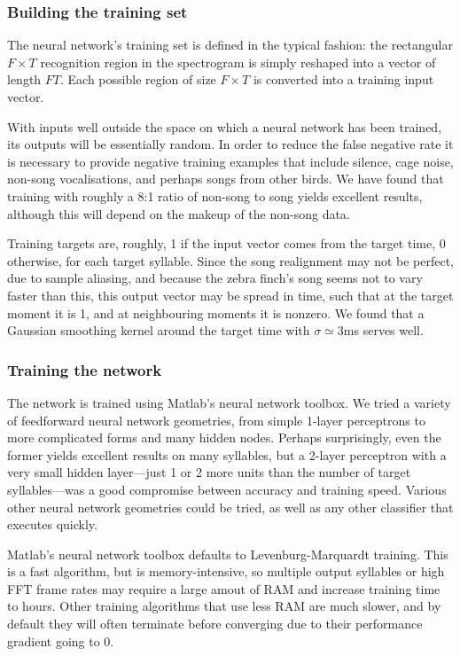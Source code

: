 \documentclass{article}
\begin{document}
\subsubsection{Building the training set}

The neural network's training set is defined in the typical fashion:
the rectangular $F\times T$ recognition region in the spectrogram is
simply reshaped into a vector of length $FT$. Each possible region of
size $F\times T$ is converted into a training input vector.

With inputs well outside the space on which a neural network has been
trained, its outputs will be essentially random. In order to reduce
the false negative rate it is necessary to provide negative training
examples that include silence, cage noise, non-song vocalisations, and
perhaps songs from other birds. We have found that training with
roughly a 8:1 ratio of non-song to song yields excellent results,
although this will depend on the makeup of the non-song data.

Training targets are, roughly, 1 if the input vector comes from the
target time, 0 otherwise, for each target syllable. Since the song
realignment may not be perfect, due to sample aliasing, and because
the zebra finch's song seems not to vary faster than this, this output
vector may be spread in time, such that at the target moment it is 1,
and at neighbouring moments it is nonzero. We found that a Gaussian
smoothing kernel around the target time with $\sigma\simeq 3$ms serves
well.

\subsubsection{Training the network}

The network is trained using Matlab's neural network toolbox. We tried
a variety of feedforward neural network geometries, from simple
1-layer perceptrons to more complicated forms and many hidden
nodes. Perhaps surprisingly, even the former yields excellent results
on many syllables, but a 2-layer perceptron with a very small hidden
layer---just 1 or 2 more units than the number of target
syllables---was a good compromise between accuracy and training
speed. Various other neural network geometries could be tried, as well
as any other classifier that executes quickly.

Matlab's neural network toolbox defaults to Levenburg-Marquardt
training. This is a fast algorithm, but is memory-intensive, so
multiple output syllables or high FFT frame rates may require a large
amout of RAM and increase training time to hours. Other training
algorithms that use less RAM are much slower, and by default they will
often terminate before converging due to their performance gradient
going to 0.
\end{document}
